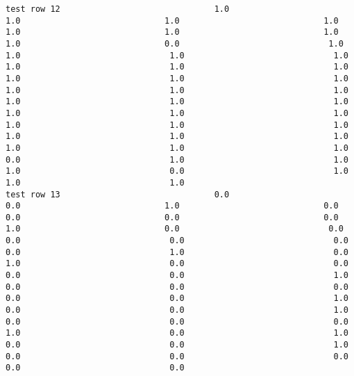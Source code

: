 \documentclass[11pt]{article}
\begin{document}
\begin{verbatim}
test row 12                               1.0                             1.0                             1.0                             1.0                             1.0                             1.0                             1.0                             1.0                             0.0                              1.0                              1.0                              1.0                              1.0                              1.0                              1.0                              1.0                              1.0                              1.0                              1.0                              1.0                              1.0                              1.0                              1.0                              1.0                              1.0                              1.0                              1.0                              1.0                              1.0                              1.0                              1.0                              1.0                              1.0                              1.0                              1.0                              1.0                              1.0                              0.0                              1.0                              1.0                              1.0                              0.0                              1.0                              1.0                              1.0
test row 13                               0.0                             0.0                             1.0                             0.0                             0.0                             0.0                             0.0                             1.0                             0.0                              0.0                              0.0                              0.0                              0.0                              0.0                              1.0                              0.0                              1.0                              0.0                              0.0                              0.0                              0.0                              1.0                              0.0                              0.0                              0.0                              0.0                              0.0                              1.0                              0.0                              0.0                              1.0                              0.0                              0.0                              0.0                              1.0                              0.0                              1.0                              0.0                              0.0                              1.0                              0.0                              0.0                              0.0                              0.0                              0.0

\end{verbatim}
\end{document}
